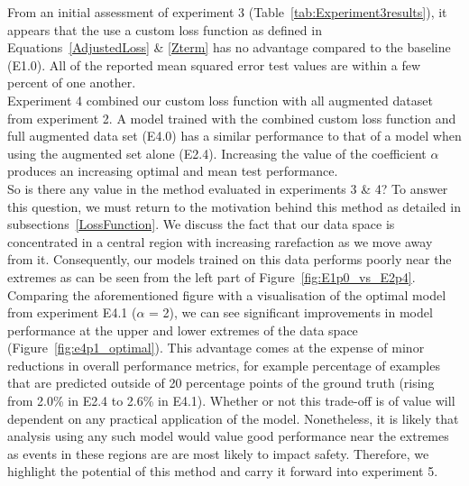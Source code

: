 \noindent
From an initial assessment of experiment 3 (Table~\ref{tab:Experiment3results}), it appears that the use a custom loss function as defined in Equations~\ref{AdjustedLoss} \& \ref{Zterm} has no advantage compared to the baseline (E1.0). All of the reported mean squared error test values are within a few percent of one another. 
\\

\noindent
Experiment 4 combined our custom loss function with all augmented dataset from experiment 2. A model trained with the combined custom loss function and full augmented data set (E4.0) has a similar performance to that of a model when using the augmented set alone (E2.4). Increasing the value of the coefficient $\alpha$ produces an increasing optimal and mean test performance.
\\

\noindent
So is there any value in the method evaluated in experiments 3 \& 4? To answer this question, we must return to the motivation behind this method as detailed in subsections~\ref{LossFunction}. We discuss the fact that our data space is concentrated in a central region with increasing rarefaction as we move away from it. Consequently, our models trained on this data performs poorly near the extremes as can be seen from the left part of Figure~\ref{fig:E1p0_vs_E2p4}. Comparing the aforementioned figure with a visualisation of the optimal model from experiment E4.1 ($\alpha$ = 2), we can see significant improvements in model performance at the upper and lower extremes of the data space (Figure~\ref{fig:e4p1_optimal}). This advantage comes at the expense of minor reductions in overall performance metrics, for example percentage of examples that are predicted outside of 20 percentage points of the ground truth (rising from 2.0\% in E2.4 to 2.6\% in E4.1). Whether or not this trade-off is of value will dependent on any practical application of the model. Nonetheless, it is likely that analysis using any such model would value good performance near the extremes as events in these regions are are most likely to impact safety. Therefore, we highlight the potential of this method and carry it forward into experiment 5.
\\

